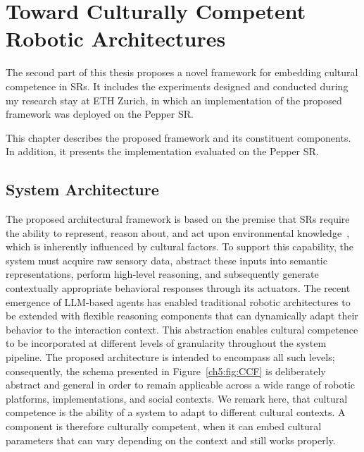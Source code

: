 \chapter{Toward Culturally Competent Robotic Architectures }
\label{ch5}

\ifpdf
    \graphicspath{{Chapter5/Figs/Raster/}{Chapter5/Figs/PDF/}{Chapter5/Figs/}}
\else
    \graphicspath{{Chapter5/Figs/Vector/}{Chapter5/Figs/}}
\fi

The second part of this thesis proposes a novel framework for embedding cultural competence in SRs. It includes the experiments designed and conducted during my research stay at ETH Zurich, in which an implementation of the proposed framework was deployed on the Pepper SR.

This chapter describes the proposed framework and its constituent components. In addition, it presents the implementation evaluated on the Pepper SR.

\section{System Architecture}

The proposed architectural framework is based on the premise that SRs require the ability to represent, reason about, and act upon environmental knowledge~\citep{SocialRobotics}, which is inherently influenced by cultural factors. 
To support this capability, the system must acquire raw sensory data, abstract these inputs into semantic representations, perform high-level reasoning, and subsequently generate contextually appropriate behavioral responses through its actuators. 
The recent emergence of LLM-based agents has enabled traditional robotic architectures to be extended with flexible reasoning components that can dynamically adapt their behavior to the interaction context. 
This abstraction enables cultural competence to be incorporated at different levels of granularity throughout the system pipeline. 
The proposed architecture is intended to encompass all such levels; consequently, the schema presented in Figure~\ref{ch5:fig:CCF} is deliberately abstract and general in order to remain applicable across a wide range of robotic platforms, implementations, and social contexts.
We remark here, that cultural competence is the ability of a system to adapt to different cultural contexts.
A component is therefore culturally competent, when it can embed cultural parameters that can vary depending on the context and still works properly.

